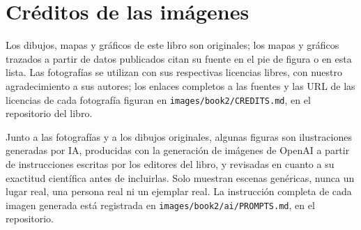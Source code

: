 \chapter*{Créditos de las imágenes}

Los dibujos, mapas y gráficos de este libro son originales; los mapas y
gráficos trazados a partir de datos publicados citan su fuente en el pie de
figura o en esta lista. Las fotografías se utilizan con sus respectivas
licencias libres, con nuestro agradecimiento a sus autores; los enlaces
completos a las fuentes y las URL de las licencias de cada fotografía
figuran en \texttt{images/book2/CREDITS.md}, en el repositorio del libro.

\bigskip
Junto a las fotografías y a los dibujos originales, algunas figuras son
ilustraciones generadas por IA, producidas con la generación de imágenes de
OpenAI a partir de instrucciones escritas por los editores del libro, y
revisadas en cuanto a su exactitud científica antes de incluirlas. Solo
muestran escenas genéricas, nunca un lugar real, una persona real ni un
ejemplar real. La instrucción completa de cada imagen generada está
registrada en \texttt{images/book2/ai/PROMPTS.md}, en el repositorio.

